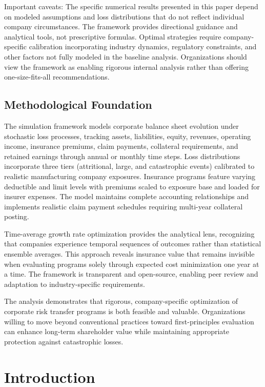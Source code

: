 \documentclass[11pt,letterpaper]{article}
\begin{document}
Important caveats: The specific numerical results presented in this paper depend on modeled assumptions and loss distributions that do not reflect individual company circumstances. The framework provides directional guidance and analytical tools, not prescriptive formulas. Optimal strategies require company-specific calibration incorporating industry dynamics, regulatory constraints, and other factors not fully modeled in the baseline analysis. Organizations should view the framework as enabling rigorous internal analysis rather than offering one-size-fits-all recommendations.

\subsection{Methodological Foundation}

The simulation framework models corporate balance sheet evolution under stochastic loss processes, tracking assets, liabilities, equity, revenues, operating income, insurance premiums, claim payments, collateral requirements, and retained earnings through annual or monthly time steps. Loss distributions incorporate three tiers (attritional, large, and catastrophic events) calibrated to realistic manufacturing company exposures. Insurance programs feature varying deductible and limit levels with premiums scaled to exposure base and loaded for insurer expenses. The model maintains complete accounting relationships and implements realistic claim payment schedules requiring multi-year collateral posting.

Time-average growth rate optimization provides the analytical lens, recognizing that companies experience temporal sequences of outcomes rather than statistical ensemble averages. This approach reveals insurance value that remains invisible when evaluating programs solely through expected cost minimization one year at a time. The framework is transparent and open-source, enabling peer review and adaptation to industry-specific requirements.

The analysis demonstrates that rigorous, company-specific optimization of corporate risk transfer programs is both feasible and valuable. Organizations willing to move beyond conventional practices toward first-principles evaluation can enhance long-term shareholder value while maintaining appropriate protection against catastrophic losses.

\section{Introduction}
\end{document}
